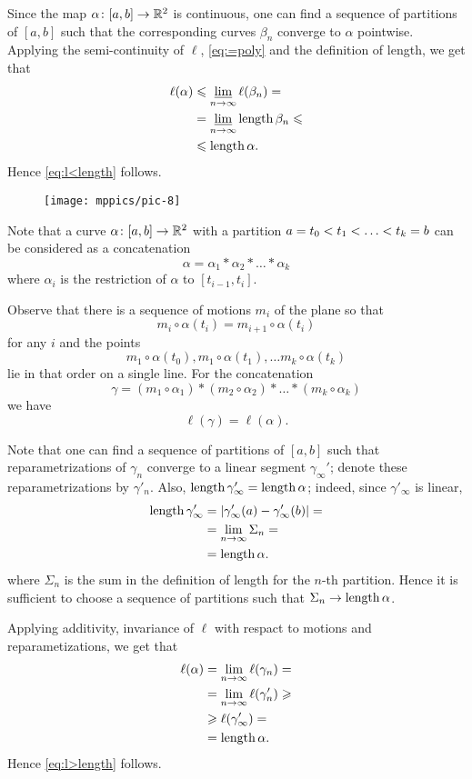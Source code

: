 Since the map  $\alpha\colon[a,b]\to \mathbb{R}^2$ is continuous,
one can find a sequence of partitions of $[a,b]$ such that the corresponding curves $\beta_n$ converge to $\alpha$ pointwise.
Applying the semi-continuity of $\ell$, \ref{eq:=poly} and the definition of length, we get that 
\begin{align*}
\ell(\alpha)&\leqslant \varliminf_{n\to\infty}\ell(\beta_n)=
\\
&=\varliminf_{n\to\infty}\mathop{\rm length}\nolimits\beta_n\leqslant
\\
&\leqslant\mathop{\rm length}\nolimits \alpha.
\end{align*}
Hence \ref{eq:l<length} follows.

\begin{wrapfigure}{r}{36 mm}
\vskip-4mm
\centering
\texttt{[image: mppics/pic-8]}
\end{wrapfigure}

Note that a curve $\alpha\colon[a,b]\to \mathbb{R}^2$ with a partition $a=t_0\z<t_1\z<\z\dots\z<t_k=b$ can be considered as a concatenation
\[\alpha=\alpha_1*\alpha_2*\dots*\alpha_k\]
where $\alpha_i$ is the restriction of $\alpha$ to $[t_{i-1},t_i]$.

Observe that there is a sequence of motions $m_i$ of the plane so that 
\[m_i\circ\alpha(t_i)=m_{i+1}\circ\alpha(t_i)\] 
for any $i$ and 
the points 
\[m_1\circ\alpha(t_0), m_1\circ\alpha(t_1),\dots m_k\circ\alpha(t_k)\] 
lie in that order on a single line.
For the concatenation 
\[\gamma=(m_1\circ\alpha_1)*(m_2\circ\alpha_2)*\dots*(m_k\circ\alpha_k)\]
we have
\[\ell(\gamma)=\ell(\alpha).\]

Note that one can find a sequence of partitions of $[a,b]$ such that reparametrizations of  $\gamma_n$ converge to a linear segment $\gamma_\infty'$;
denote these reparametrizations by $\gamma'_n$.
Also, $\length\gamma'_\infty\z=\length\alpha$;
indeed, since $\gamma'_\infty$ is linear,
\begin{align*}
\mathop{\rm length}\nolimits \gamma'_\infty&=|\gamma'_\infty (a)-\gamma'_\infty (b)|=
\\
&=\lim_{n\to\infty}\Sigma_n=
\\
&=\mathop{\rm length}\nolimits\alpha.
\end{align*}
where $\Sigma_n$ is the sum in the definition of length for the $n$-th partition.
Hence it is sufficient to choose a sequence of partitions such that $\Sigma_n\z\to\length\alpha$.

Applying additivity, invariance of $\ell$ with respact to motions and reparametizations, we get that
\begin{align*}
\ell(\alpha)&=\lim_{n\to\infty}\ell(\gamma_n)=
\\
&=\lim_{n\to\infty}\ell(\gamma_n')\geqslant
\\
&\geqslant \ell(\gamma_\infty')=
\\
&=\mathop{\rm length}\nolimits\alpha.
\end{align*}
Hence \ref{eq:l>length} follows.
\qeds

